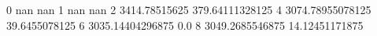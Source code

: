 0 nan nan
1 nan nan
2 3414.78515625 379.64111328125
4 3074.78955078125 39.6455078125
6 3035.14404296875 0.0
8 3049.2685546875 14.12451171875
